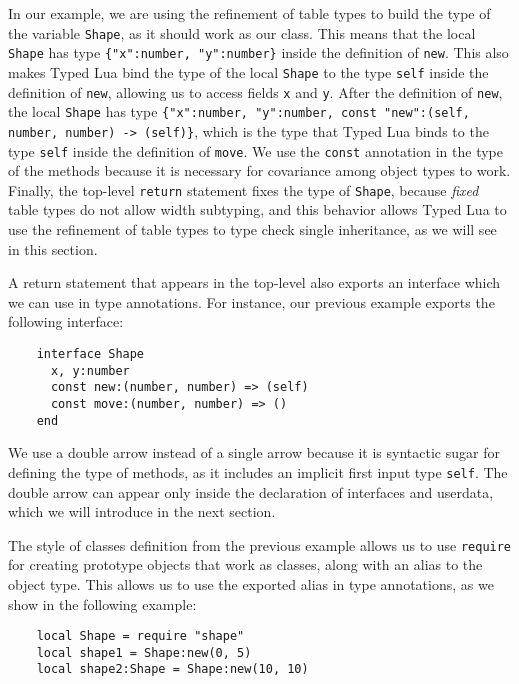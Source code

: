 In our example, we are using the refinement of table types to
build the type of the variable \texttt{Shape},
as it should work as our class.
This means that the local \texttt{Shape} has type
\texttt{\{"x":number, "y":number\}} inside the definition of \texttt{new}.
This also makes Typed Lua bind the type of the local \texttt{Shape}
to the type \texttt{self} inside the definition of \texttt{new},
allowing us to access fields \texttt{x} and \texttt{y}.
After the definition of \texttt{new}, the local \texttt{Shape}
has type
\texttt{\{"x":number, "y":number, const "new":(self, number, number) -> (self)\}},
which is the type that Typed Lua binds to the type \texttt{self}
inside the definition of \texttt{move}.
We use the \texttt{const} annotation in the type of the methods
because it is necessary for covariance among object types to work.
Finally, the top-level \texttt{return} statement fixes the type of
\texttt{Shape}, because \emph{fixed} table types do not allow width
subtyping, and this behavior allows Typed Lua to use the refinement
of table types to type check single inheritance, as we will see in
this section.

A return statement that appears in the top-level also exports an
interface which we can use in type annotations.
For instance, our previous example exports the following interface:
\begin{verbatim}
    interface Shape
      x, y:number
      const new:(number, number) => (self)
      const move:(number, number) => ()
    end
\end{verbatim}

We use a double arrow instead of a single arrow because it is
syntactic sugar for defining the type of methods,
as it includes an implicit first input type \texttt{self}.
The double arrow can appear only inside the declaration of
interfaces and userdata, which we will introduce in the next section.

The style of classes definition from the previous example
allows us to use \texttt{require} for creating prototype objects that
work as classes, along with an alias to the object type.
This allows us to use the exported alias in type annotations,
as we show in the following example:
\begin{verbatim}
    local Shape = require "shape"
    local shape1 = Shape:new(0, 5)
    local shape2:Shape = Shape:new(10, 10)
\end{verbatim}

